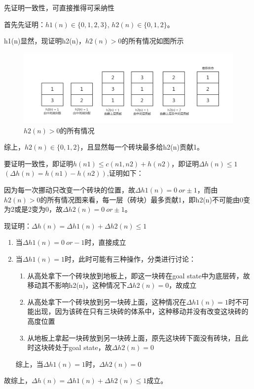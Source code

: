 \documentclass[a4paper, 11pt]{article}
\begin{document}
	先证明一致性，可直接推得可采纳性

	首先先证明：$h1(n) \in \{0,1,2,3\}$, $h2(n) \in \{0,1,2\}$。

	h1(n)显然，现证明h2(n)，$h2(n)>0$的所有情况如图所示

    \begin{figure}
      \centering
      \includegraphics[width=15cm]{5.png}
      \caption{$h2(n)>0$的所有情况}
    \end{figure}

	综上，$h2(n) \in \{0,1,2\}$，且显然每一个砖块最多给h2(n)贡献1。

	要证明一致性，即证明$h(n1) \le c(n1,n2) + h(n2)$，即证明$\Delta h(n) \le 1$ $(\Delta h(n)=h(n1)-h(n2))$,证明如下：

	因为每一次挪动只改变一个砖块的位置，故$\Delta h1(n) = 0 \ or \pm1$，而由$h2(n)>0$的所有情况图来看，每一层（砖块）最多贡献1，即h2(n)不可能由0变为2或是2变为0，故$\Delta h2(n) = 0 \ or \pm1$。


	现证明：$\Delta h(n) =  \Delta h1(n)+\Delta h2(n) \le 1$
	\begin{enumerate}
	\item 当$\Delta h1(n) = 0 \ or -1$时，直接成立
	\item 当$\Delta h1(n) = 1$时，此时可能有三种操作，分类进行讨论：
		\begin{enumerate}
		\item 从高处拿下一个砖块放到地板上，即这一块砖在goal state中为底层砖，故移动其不影响h2(n)，这种情况下$\Delta h2(n) = 0$，故成立
		\item 从高处拿下一个砖块放到另一块砖上面，这种情况在$\Delta h1(n) = 1$时不可能出现，因为该砖在只有三块砖的体系中，这种移动并没有改变这块砖的高度位置
		\item 从地板上拿起一块砖放到另一块砖上面，原先这块砖下面没有砖块，且此时这块砖处于goal state，故$\Delta h2(n) = 0$
		\end{enumerate}
		综上，当$\Delta h1(n) = 1$时，$\Delta h2(n) = 0$
	\end{enumerate}

	故综上，$\Delta h(n) =  \Delta h1(n)+\Delta h2(n) \le 1$成立。
\end{document}
